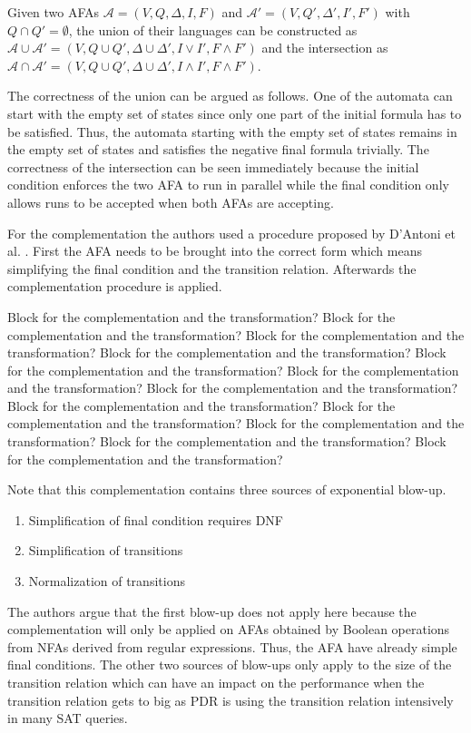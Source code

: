 Given two AFAs $\mathcal{A} = (V,Q,\Delta, I, F)$ and $\mathcal{A}' = (V,Q',\Delta', I', F')$ with $Q \cap Q' = \emptyset$, the union of their languages can be constructed as $\mathcal{A} \cup \mathcal{A}' = (V,Q \cup Q',\Delta \cup \Delta', I\vee I', F\wedge F')$ and the intersection as $\mathcal{A} \cap \mathcal{A}' = (V,Q \cup Q',\Delta \cup \Delta', I\wedge I', F\wedge F')$.

The correctness of the union can be argued as follows.
One of the automata can start with the empty set of states since only one part of the initial formula has to be satisfied. 
Thus, the automata starting with the empty set of states remains in the empty set of states and satisfies the negative final formula trivially. 
The correctness of the intersection can be seen immediately because the initial condition enforces the two AFA to run in parallel while the final condition only allows runs to be accepted when both AFAs are accepting.

For the complementation the authors used a procedure proposed by D'Antoni et al. \cite{???}. 
First the AFA needs to be brought into the correct form which means simplifying the final condition and the transition relation.
Afterwards the complementation procedure is applied.

Block for the complementation and the transformation?
Block for the complementation and the transformation?
Block for the complementation and the transformation?
Block for the complementation and the transformation?
Block for the complementation and the transformation?
Block for the complementation and the transformation?
Block for the complementation and the transformation?
Block for the complementation and the transformation?
Block for the complementation and the transformation?
Block for the complementation and the transformation?
Block for the complementation and the transformation?
Block for the complementation and the transformation?

Note that this complementation contains three sources of exponential blow-up.
\begin{enumerate}
\item Simplification of final condition requires DNF
\item Simplification of transitions
\item Normalization of transitions
\end{enumerate}

The authors argue that the first blow-up does not apply here because the complementation will only be applied on AFAs obtained by Boolean operations from NFAs derived from regular expressions.
Thus, the AFA have already simple final conditions.
The other two sources of blow-ups only apply to the size of the transition relation which can have an impact on the performance when the transition relation gets to big as PDR is using the transition relation intensively in many SAT queries.
